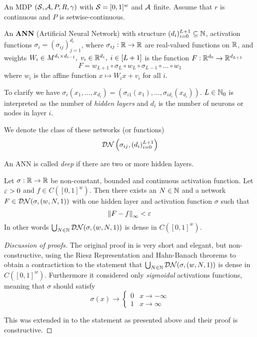 \begin{sett}
  An MDP $(\mathcal{S}, \mathcal{A}, P, R, \gamma)$ with
  $\mathcal{S} = [0,1]^w$ and $\mathcal{A}$ finite.
  Assume that $r$ is continuous and
  $P$ is setwise-continuous.
  \label{sett:annApprox}
\end{sett}

\begin{defn}\label{def_ANN}
  An \textbf{ANN} (Artificial Neural Network) with structure
  $(d_i)_{i=0}^{L+1} \subseteq \mathbb{N}$,
  activation functions $\sigma_i = (\sigma_{ij})_{j=1}^{d_i}$, where
  $\sigma_{ij} : \mathbb{R} \to \mathbb{R}$ are real-valued functions on $\mathbb{R}$,
  and weights $W_i \in M^{d_i \times d_{i-1}}, \; v_i \in \mathbb{R}^{d_i}, \;
  i \in [L+1]$
  is the function $F:\mathbb{R}^{d_0} \to \mathbb{R}^{d_{L+1}}$ 
  \[ F = w_{L+1} \circ \sigma_L \circ w_L
  \circ \sigma_{L-1} \circ \dots \circ w_1 \]
  where $w_i$ is the affine function $x \mapsto W_i x + v_i$ for all $i$.
\end{defn}

To clarify we have $\sigma_i(x_1, \dots, x_{d_i})
= (\sigma_{i1}(x_1), \dots, \sigma_{id_{i}}(x_{d_{i}}))$.
$L \in \mathbb{N}_0$ is interpreted as the number of \emph{hidden layers} and
$d_i$ is the number of neurons or nodes in layer $i$.

We denote the class of these networks (or functions)
\[ \mathcal{DN} \left(\sigma_{ij}, ( d_i )_{i=0}^{L+1} \right) \]

An ANN is called \emph{deep} if there are two or more hidden layers.


\begin{thm}
  Let $\sigma: \mathbb{R} \to \mathbb{R}$ be non-constant, bounded and continuous
  activation function.
  Let $\varepsilon > 0$ and $f \in C([0,1]^w)$.
  Then there exists an $N \in \mathbb{N}$ and a network
  $F \in \mathcal{DN}(\sigma, (w, N, 1))$
  with one hidden layer
  and activation function $\sigma$ such that
  \[ \norm{F - f}_\infty < \varepsilon \]
  In other words $\bigcup_{N \in \mathbb{N}} \mathcal{DN}(\sigma, (w, N, 1))$ is
  dense in $C([0,1]^w)$.
  \label{thm:uniApprox}
\end{thm}
\begin{proof}[Discussion of proofs]
  The original proof in  is very short and elegant,
  but non-constructive,
  using the Riesz Representation and Hahn-Banach theorems to
  obtain a contractiction to the statement that
  $\bigcup_{N \in \mathbb{N}} \mathcal{DN}(\sigma, (w,N,1))$
  is dense in $C([0,1]^w)$.
  Furthermore it considered only \emph{sigmoidal} activations
  functions, meaning that $\sigma$ should satisfy
  \[ \sigma(x) \to \begin{cases} 0 & x \to -\infty
  \\ 1 & x \to \infty \end{cases} \]
  
  This was extended in  to the statement as presented above
  and their proof is constructive. 
\end{proof}

